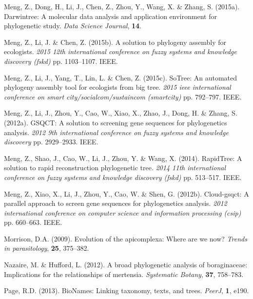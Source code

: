\documentclass[]{article}
\begin{document}
\leavevmode\hypertarget{ref-meng2015darwintree}{}%
Meng, Z., Dong, H., Li, J., Chen, Z., Zhou, Y., Wang, X. \& Zhang, S. (2015a). Darwintree: A molecular data analysis and application environment for phylogenetic study. \emph{Data Science Journal}, \textbf{14}.

\leavevmode\hypertarget{ref-meng2015solution}{}%
Meng, Z., Li, J. \& Chen, Z. (2015b). A solution to phylogeny assembly for ecologists. \emph{2015 12th international conference on fuzzy systems and knowledge discovery (fskd)} pp. 1103--1107. IEEE.

\leavevmode\hypertarget{ref-meng2015sotree}{}%
Meng, Z., Li, J., Yang, T., Lin, L. \& Chen, Z. (2015c). SoTree: An automated phylogeny assembly tool for ecologists from big tree. \emph{2015 ieee international conference on smart city/socialcom/sustaincom (smartcity)} pp. 792--797. IEEE.

\leavevmode\hypertarget{ref-meng2012gsqct}{}%
Meng, Z., Li, J., Zhou, Y., Cao, W., Xiao, X., Zhao, J., Dong, H. \& Zhang, S. (2012a). GSQCT: A solution to screening gene sequences for phylogenetics analysis. \emph{2012 9th international conference on fuzzy systems and knowledge discovery} pp. 2929--2933. IEEE.

\leavevmode\hypertarget{ref-meng2014rapidtree}{}%
Meng, Z., Shao, J., Cao, W., Li, J., Zhou, Y. \& Wang, X. (2014). RapidTree: A solution to rapid reconstruction phylogenetic tree. \emph{2014 11th international conference on fuzzy systems and knowledge discovery (fskd)} pp. 513--517. IEEE.

\leavevmode\hypertarget{ref-meng2012cloud}{}%
Meng, Z., Xiao, X., Li, J., Zhou, Y., Cao, W. \& Shen, G. (2012b). Cloud-gsqct: A parallel approach to screen gene sequences for phylogenetics analysis. \emph{2012 international conference on computer science and information processing (csip)} pp. 660--663. IEEE.

\leavevmode\hypertarget{ref-morrison2009apicomplexa}{}%
Morrison, D.A. (2009). Evolution of the apicomplexa: Where are we now? \emph{Trends in parasitology}, \textbf{25}, 375--382.

\leavevmode\hypertarget{ref-nazaire2012broad}{}%
Nazaire, M. \& Hufford, L. (2012). A broad phylogenetic analysis of boraginaceae: Implications for the relationships of mertensia. \emph{Systematic Botany}, \textbf{37}, 758--783.

\leavevmode\hypertarget{ref-page2013bionames}{}%
Page, R.D. (2013). BioNames: Linking taxonomy, texts, and trees. \emph{PeerJ}, \textbf{1}, e190.
\end{document}
